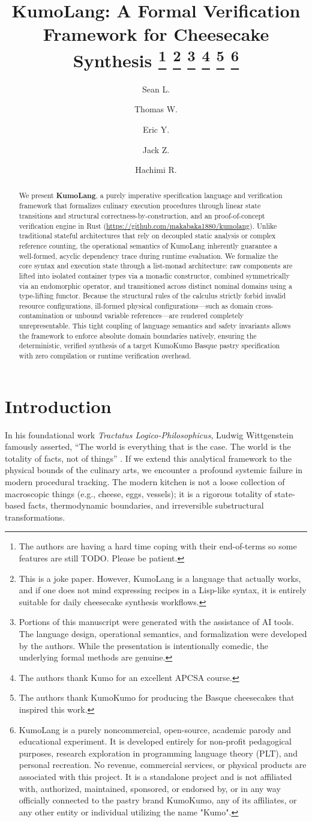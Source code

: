 \documentclass[11pt, a4paper]{article}
\title{
KumoLang:
A Formal Verification Framework for Cheesecake Synthesis
\thanks{The authors are having a hard time coping with their end-of-terms so some features are still TODO. Please be patient.}
\thanks{
This is a joke paper. However, KumoLang is a language that actually works, and if one does not mind expressing recipes in a Lisp-like syntax, it is entirely suitable for daily cheesecake synthesis workflows.
}
\thanks{
Portions of this manuscript were generated with the assistance of AI tools. The language design, operational semantics, and formalization were developed by the authors. While the presentation is intentionally comedic, the underlying formal methods are genuine.
}
\thanks{
The authors thank Kumo for an excellent APCSA course.
}
\thanks{
The authors thank KumoKumo for producing the Basque cheesecakes that inspired this work.
}
\thanks{
KumoLang is a purely noncommercial, open-source, academic parody and educational experiment. It is developed entirely for non-profit pedagogical purposes, research exploration in programming language theory (PLT), and personal recreation. No revenue, commercial services, or physical products are associated with this project. It is a standalone project and is not affiliated with, authorized, maintained, sponsored, or endorsed by, or in any way officially connected to the pastry brand KumoKumo, any of its affiliates, or any other entity or individual utilizing the name "Kumo".
}
}
\author{
  Sean L. \\
  \and
  Thomas W. \\
  \and
  Eric Y. \\
  \and
  Jack Z. \\
  \and
  Hachimi R. \\
}
\begin{document}
\maketitle
\begin{abstract}
    We present \textbf{KumoLang}, a purely imperative specification language and verification framework that formalizes culinary execution procedures through linear state transitions and structural correctness-by-construction, and an proof-of-concept verification engine in Rust (\url{https://github.com/makabaka1880/kumolang}). Unlike traditional stateful architectures that rely on decoupled static analysis or complex reference counting, the operational semantics of KumoLang inherently guarantee a well-formed, acyclic dependency trace during runtime evaluation. We formalize the core syntax and execution state through a list-monad architecture: raw components are lifted into isolated container types via a monadic  constructor, combined symmetrically via an endomorphic  operator, and transitioned across distinct nominal domains using a type-lifting  functor. Because the structural rules of the calculus strictly forbid invalid resource configurations, ill-formed physical configurations—such as domain cross-contamination or unbound variable references—are rendered completely unrepresentable. This tight coupling of language semantics and safety invariants allows the framework to enforce absolute domain boundaries natively, ensuring the deterministic, verified synthesis of a target KumoKumo Basque pastry specification with zero compilation or runtime verification overhead.
\end{abstract}

\section{Introduction}
In his foundational work \emph{Tractatus Logico-Philosophicus}, Ludwig Wittgenstein famously asserted, ``The world is everything that is the case. The world is the totality of facts, not of things'' \cite{wit}. If we extend this analytical framework to the physical bounds of the culinary arts, we encounter a profound systemic failure in modern procedural tracking. The modern kitchen is not a loose collection of macroscopic things (e.g., cheese, eggs, vessels); it is a rigorous totality of state-based facts, thermodynamic boundaries, and irreversible substructural transformations.
\end{document}

